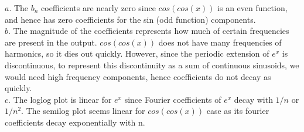 \documentclass[11pt, a4paper]{article}
\begin{document}
{$a.$ The $b_{n}$ coefficients are nearly zero since $cos(cos(x))$ is an even function, and hence has zero coefficients for the sin (odd function) components.}
\\
{$b.$ The magnitude of the coefficients represents how much of certain frequencies are present in the output. $cos(cos(x))$ does not have many frequencies of harmonics, so it dies out quickly. However, since the periodic extension of $e^{x}$ is discontinuous, to represent this discontinuity as a sum of continuous sinusoids, we would need high frequency components, hence coefficients do not decay as quickly.}
\\
{$c.$ The loglog plot is linear for $e^{x}$ since Fourier coefficients of $e^{x}$ decay with $1/n$ or $1/n^{2}$. The semilog plot seems linear for $cos(cos(x))$ case as its fourier coefficients decay exponentially with n.
}
\end{document}

